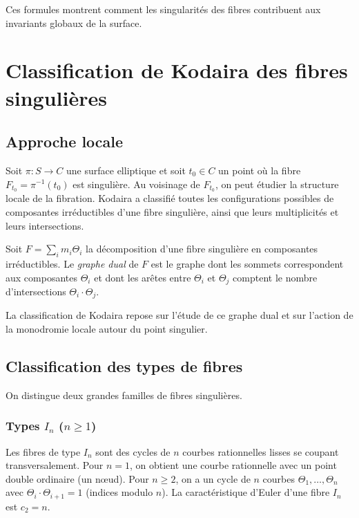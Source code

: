 Ces formules montrent comment les singularités des fibres contribuent aux invariants globaux de la surface.

\section{Classification de Kodaira des fibres singulières}

\subsection{Approche locale}

Soit $\pi: S \to C$ une surface elliptique et soit $t_0 \in C$ un point où la fibre $F_{t_0} = \pi^{-1}(t_0)$ est singulière. Au voisinage de $F_{t_0}$, on peut étudier la structure locale de la fibration. Kodaira a classifié toutes les configurations possibles de composantes irréductibles d'une fibre singulière, ainsi que leurs multiplicités et leurs intersections.

\begin{definition}
Soit $F = \sum_i m_i \Theta_i$ la décomposition d'une fibre singulière en composantes irréductibles. Le \emph{graphe dual} de $F$ est le graphe dont les sommets correspondent aux composantes $\Theta_i$ et dont les arêtes entre $\Theta_i$ et $\Theta_j$ comptent le nombre d'intersections $\Theta_i \cdot \Theta_j$.
\end{definition}

La classification de Kodaira repose sur l'étude de ce graphe dual et sur l'action de la monodromie locale autour du point singulier.

\subsection{Classification des types de fibres}

On distingue deux grandes familles de fibres singulières.

\subsubsection{Types $I_n$ ($n \ge 1$)}

Les fibres de type $I_n$ sont des cycles de $n$ courbes rationnelles lisses se coupant transversalement. Pour $n=1$, on obtient une courbe rationnelle avec un point double ordinaire (un nœud). Pour $n \ge 2$, on a un cycle de $n$ courbes $\Theta_1, \dots, \Theta_n$ avec $\Theta_i \cdot \Theta_{i+1} = 1$ (indices modulo $n$). La caractéristique d'Euler d'une fibre $I_n$ est $c_2 = n$.

